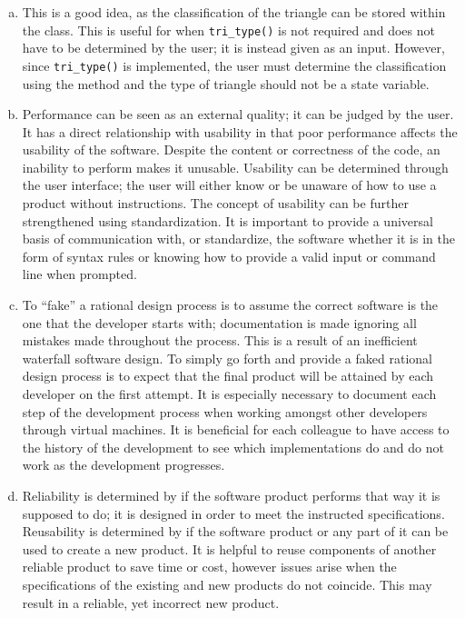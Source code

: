 \documentclass[12pt]{article}
\begin{document}
\begin{enumerate}[(a)]
\item This is a good idea, as the classification of the triangle can be stored within the class. This is useful for when \verb|tri_type()| is not required and does not have to be determined by the user; it is instead given as an input. However, since \verb|tri_type()| is implemented, the user must determine the classification using the method and the type of triangle should not be a state variable.

\item Performance can be seen as an external quality; it can be judged by the user. It has a direct relationship with usability in that poor performance affects the usability of the software. Despite the content or correctness of the code, an inability to perform makes it unusable. Usability can be determined through the user interface; the user will either know or be unaware of how to use a product without instructions. The concept of usability can be further strengthened using standardization. It is important to provide a universal basis of communication with, or standardize, the software whether it is in the form of syntax rules or knowing how to provide a valid input or command line when prompted. 

\item To “fake” a rational design process is to assume the correct software is the one that the developer starts with; documentation is made ignoring all mistakes made throughout the process. This is a result of an inefficient waterfall software design. To simply go forth and provide a faked rational design process is to expect that the final product will be attained by each developer on the first attempt. It is especially necessary to document each step of the development process when working amongst other developers through virtual machines. It is beneficial for each colleague to have access to the history of the development to see which implementations do and do not work as the development progresses. 

\item Reliability is determined by if the software product performs that way it is supposed to do; it is designed in order to meet the instructed specifications. Reusability is determined by if the software product or any part of it can be used to create a new product. It is helpful to reuse components of another reliable product to save time or cost, however issues arise when the specifications of the existing and new products do not coincide. This may result in a reliable, yet incorrect new product. 


\end{enumerate}
\end{document}
